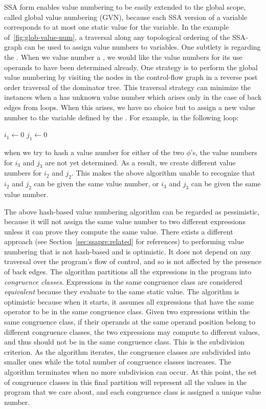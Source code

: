 SSA form enables value numbering to be easily extended to the global scope, called global value numbering (GVN), because each SSA version of a variable corresponds to at most one static value for the variable. 
In the example of~\ref{fig:glob-value-num}, a traversal along any topological ordering of the SSA-graph can be used to assign value numbers to variables. 
One subtlety is regarding the \phifuns. 
When we value number a \phifun, we would like the value numbers for its use operands to have been determined already. 
One strategy is to perform the global value numbering by visiting the nodes in the control-flow graph in a reverse post order traversal of the dominator tree. 
This traversal strategy can minimize the instances when a \phiuse has unknown value number which arises only in the case of back edges from loops. 
When this arises, we have no choice but to assign a new value number to the variable defined by the \phifun. 
For example, in the following loop:\\
\begin{algorithm}[H]
$i_1 \gets 0$\; 
$j_1 \gets 0$\; 
\end{algorithm}
when we try to hash a value number for either of the two $\phi$'s, the value numbers for $i_3$ and $j_3$ are not yet determined. 
As a result, we create different value numbers for $i_2$ and $j_2$. 
This makes the above algorithm unable to recognize that $i_2$ and $j_2$ can be given the same value number, or $i_3$ and $j_3$ can be given the same value number.

The above hash-based value numbering algorithm can be regarded as pessimistic, because it will not assign the same value number to two different expressions unless it can prove they compute the same value. 
There exists a different approach (see Section~\ref{sec:ssapre:related} for references) to performing value numbering that is not hash-based and is optimistic. 
It does not depend on any traversal over the program's flow of control, and so is not affected by the presence of back edges. 
The algorithm partitions all the expressions in the program into \emph{congruence classes}. 
Expressions in the same congruence class are considered \emph{equivalent} because they evaluate to the same static value. 
The algorithm is optimistic because when it starts, it assumes all expressions that have the same operator to be in the same congruence class. 
Given two expressions within the same congruence class, if their operands at the same operand position belong to different congruence classes, the two expressions may compute to different values, and thus should not be in the same congruence class. 
This is the subdivision criterion. 
As the algorithm iterates, the congruence classes are subdivided into smaller ones while the total number of congruence classes increases. 
The algorithm terminates when no more subdivision can occur. 
At this point, the set of congruence classes in this final partition will represent all the values in the program that we care about, and each congruence class is assigned a unique value number.

